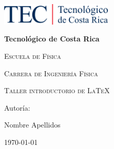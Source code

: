 \begin{titlepage}
    \centering
    {\includegraphics[width=0.4\textwidth]{figuras/Firma_TEC.png}\par}
    \vspace{1cm}
    {\bfseries\LARGE Tecnológico de Costa Rica \par}
    \vspace{1cm}
    {\scshape\Large Escuela de Física \par}
    \vspace{1cm}
    {\scshape\Large Carrera de Ingeniería Física \par}
    \vspace{3cm}
    {\scshape\Huge Taller introductorio de \LaTeX \par}
    \vspace{3cm}
    {\Large Autoría: \par}
    {\Large Nombre Apellidos \par}
    \vfill
    {\Large \today \par}
\end{titlepage}


\tableofcontents



